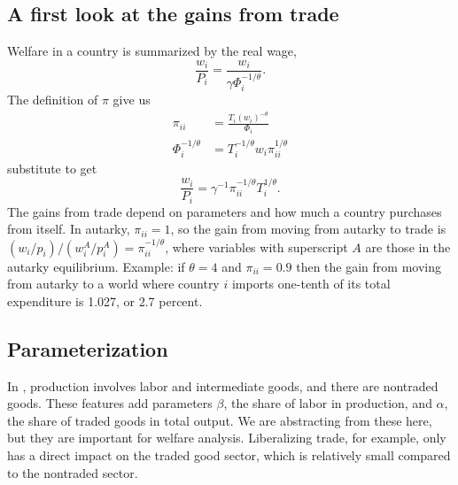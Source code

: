 \documentclass[11pt, pdftex]{article}
\begin{document}
\subsection*{A first look at the gains from trade}
Welfare in a country is summarized by the real wage,
\begin{equation}
  \frac{w_i}{P_i}=\frac{w_i}{\gamma \Phi_i^{-1/\theta}}.
\end{equation}
The definition of $\pi$ give us
\begin{align}
  \pi_{ii}&=\frac{T_i(w_i)^{-\theta}}{\Phi_i}\\
  \Phi_i^{-1/\theta}&=T_i^{-1/\theta}w_i\pi_{ii}^{1/\theta}
\end{align}
substitute to get
\begin{equation}
  \frac{w_i}{P_i}=\gamma^{-1} \pi_{ii}^{-1/\theta} T_i^{1/\theta}.
\end{equation}
The gains from trade depend on parameters and how much a country purchases from itself.  In autarky, $\pi_{ii}=1$, so the gain from moving from autarky to trade is $(w_i/p_i)/(w_i^A/p_i^A) = \pi_{ii}^{-1/\theta}$, where variables with superscript $A$ are those in the autarky equilibrium.  Example: if $\theta =4$ and $\pi_{ii}=0.9$ then the gain from moving from autarky to a world where country $i$ imports one-tenth of its total expenditure is 1.027, or 2.7 percent.

\subsection*{Parameterization}
In \citet{EK02}, production involves labor and intermediate goods, and there are nontraded goods.  These features add parameters $\beta$, the share of labor in production, and $\alpha$, the share of traded goods in total output.  We are abstracting from these here, but they are important for welfare analysis.  Liberalizing trade, for example, only has a direct impact on the traded good sector, which is relatively small compared to the nontraded sector.
\end{document}
